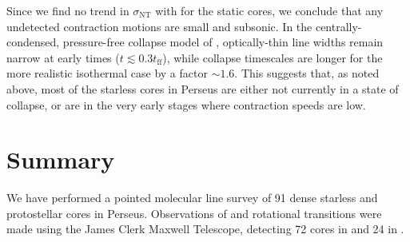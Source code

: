 \documentclass[iop,twocolappendix]{emulateapj}
\begin{document}
Since we find no trend in $\sigma_\mathrm{NT}$ with {\MMJ} for the static cores, we conclude that any undetected contraction motions are small and subsonic. In the centrally-condensed, pressure-free collapse model of \citeauthor{myers05}, optically-thin line widths remain narrow at early times ($t \lesssim 0.3 t_\mathrm{ff}$), while collapse timescales are longer for the more realistic isothermal case by a factor $\sim 1.6$. This suggests that, as noted above, most of the starless cores in Perseus are either not currently in a state of collapse, or are in the very early stages where contraction speeds are low. 

\section{Summary}
\label{sec:summary}

We have performed a pointed molecular line survey of 91 dense starless and protostellar cores in Perseus. Observations of {\HCOrot} and {\NtDrot} rotational transitions were made using the James Clerk Maxwell Telescope, detecting 72 cores in {\HCO} and 24 in {\NtD}. 
\end{document}
